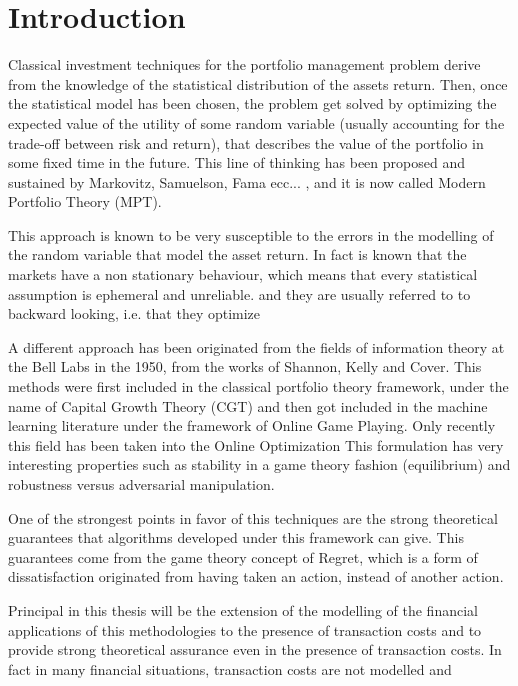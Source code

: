 \chapter{Introduction}

Classical investment techniques for the portfolio management problem derive from the knowledge of the statistical distribution of the assets return. Then, once the statistical model has been chosen, the problem get solved by optimizing the expected value of the utility of some random variable (usually accounting for the trade-off between risk and return), that describes the value of the portfolio in some fixed time in the future. This line of thinking has been proposed and sustained by Markovitz, Samuelson, Fama ecc... %
, and it is now called Modern Portfolio Theory (MPT).

This approach is known to be very susceptible to the errors in the modelling of the random variable that model the asset return. In fact is known that the markets have a non stationary behaviour, which means that every statistical assumption is ephemeral and unreliable. %
and they are usually referred to to backward looking, i.e. that they optimize 

A different approach has been originated from the fields of information theory at the Bell Labs in the 1950, from the works of Shannon, Kelly and Cover. This methods were first included in the classical portfolio theory framework, under the name of Capital Growth Theory (CGT) \cite{hakansson1995capital} and then got included in the machine learning literature under the framework of Online Game Playing. Only recently this field has been taken into the Online Optimization This formulation has very interesting properties such as stability in a game theory fashion (equilibrium) and robustness versus adversarial manipulation.

One of the strongest points in favor of this techniques are the strong theoretical guarantees that algorithms developed under this framework can give. This guarantees come from the game theory concept of Regret, which is a form of dissatisfaction originated from having taken an action, instead of another action.

Principal in this thesis will be the extension of the modelling of the financial applications of this methodologies to the presence of transaction costs and to provide strong theoretical assurance even in the presence of transaction costs. In fact in many financial situations, transaction costs are not modelled and 

